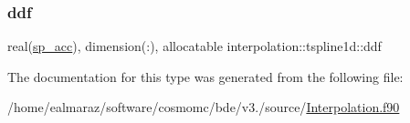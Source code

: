 \subsubsection{\texorpdfstring{ddf}{ddf}}
{\footnotesize\ttfamily real(\mbox{\hyperlink{namespaceinterpolation_af72aa9a05feb8ef90b2d26e4a013abf3}{sp\+\_\+acc}}), dimension(\+:), allocatable interpolation\+::tspline1d\+::ddf}



The documentation for this type was generated from the following file\+:\begin{DoxyCompactItemize}
\item 
/home/ealmaraz/software/cosmomc/bde/v3./source/\mbox{\hyperlink{Interpolation_8f90}{Interpolation.\+f90}}\end{DoxyCompactItemize}
